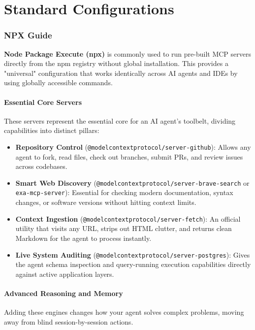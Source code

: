 \newpage
\part{Standard Configurations}

\section{NPX Guide}

\textbf{Node Package Execute (npx)} is commonly used to run pre-built MCP servers directly from the npm registry without global installation. 
This provides a "universal" configuration that works identically across AI agents and IDEs by using globally accessible commands.

\subsection{Essential Core Servers}
These servers represent the essential core for an AI agent's toolbelt, dividing capabilities into distinct pillars:

\begin{itemize}
    \item \textbf{Repository Control} (\lstinline[style=inline]|@modelcontextprotocol/server-github|): Allows any agent to fork, read files, check out branches, submit PRs, and review issues across codebases.
    \item \textbf{Smart Web Discovery} (\lstinline[style=inline]|@modelcontextprotocol/server-brave-search| or \lstinline[style=inline]|exa-mcp-server|): Essential for checking modern documentation, syntax changes, or software versions without hitting context limits.
    \item \textbf{Context Ingestion} (\lstinline[style=inline]|@modelcontextprotocol/server-fetch|): An official utility that visits any URL, strips out HTML clutter, and returns clean Markdown for the agent to process instantly.
    \item \textbf{Live System Auditing} (\lstinline[style=inline]|@modelcontextprotocol/server-postgres|): Gives the agent schema inspection and query-running execution capabilities directly against active application layers.
\end{itemize}

\subsection{Advanced Reasoning and Memory}
Adding these engines changes how your agent solves complex problems, moving away from blind session-by-session actions.

